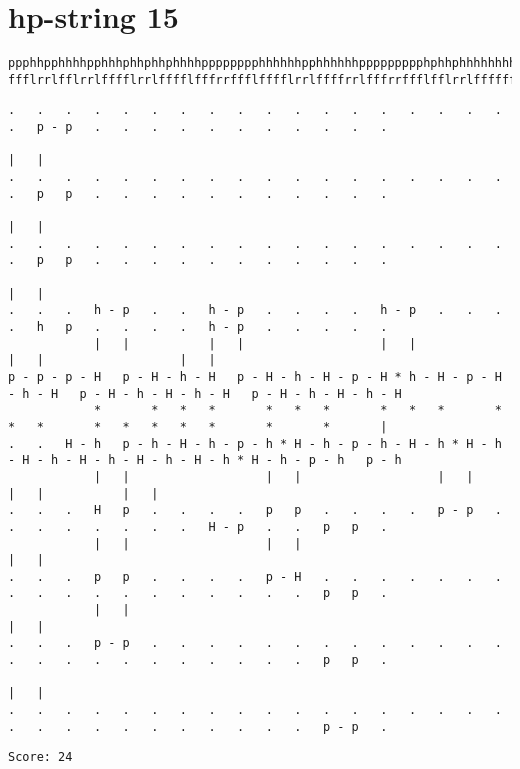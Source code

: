 \documentclass[a4paper,oneside,article,11pt]{memoir}
\begin{document}
\pagebreak

\section*{hp-string 15}
\begin{lstlisting}[basicstyle=\fontsize{6}{11}\ttfamily]
ppphhpphhhhpphhhphhphhphhhhpppppppphhhhhhpphhhhhhppppppppphphhphhhhhhhhhhhpphhhphhphpphphhhpppppphhh
ffflrrlfflrrlfffflrrlfffflfffrrffflfffflrrlffffrrlfffrrffflfflrrlfffffffflrrlfffflfrrflfffflffrrffl
\end{lstlisting}
\begin{lstlisting}[basicstyle=\fontsize{4}{11}\ttfamily]
.   .   .   .   .   .   .   .   .   .   .   .   .   .   .   .   .   .   .   p - p   .   .   .   .   .   .   .   .   .   .   .
                                                                            |   |
.   .   .   .   .   .   .   .   .   .   .   .   .   .   .   .   .   .   .   p   p   .   .   .   .   .   .   .   .   .   .   .
                                                                            |   |
.   .   .   .   .   .   .   .   .   .   .   .   .   .   .   .   .   .   .   p   p   .   .   .   .   .   .   .   .   .   .   .
                                                                            |   |
.   .   .   h - p   .   .   h - p   .   .   .   .   h - p   .   .   .   .   h   p   .   .   .   .   h - p   .   .   .   .   .
            |   |           |   |                   |   |                   |   |                   |   |
p - p - p - H   p - H - h - H   p - H - h - H - p - H * h - H - p - H - h - H   p - H - h - H - h - H   p - H - h - H - h - H
            *       *   *   *       *   *   *       *   *   *       *   *   *       *   *   *   *   *       *       *       |
.   .   H - h   p - h - H - h - p - h * H - h - p - h - H - h * H - h - H - h - H - h - H - h - H - h * H - h - p - h   p - h
            |   |                   |   |                   |   |                                   |   |           |   |
.   .   .   H   p   .   .   .   .   p   p   .   .   .   .   p - p   .   .   .   .   .   .   .   .   H - p   .   .   p   p   .
            |   |                   |   |                                                                           |   |
.   .   .   p   p   .   .   .   .   p - H   .   .   .   .   .   .   .   .   .   .   .   .   .   .   .   .   .   .   p   p   .
            |   |                                                                                                   |   |
.   .   .   p - p   .   .   .   .   .   .   .   .   .   .   .   .   .   .   .   .   .   .   .   .   .   .   .   .   p   p   .
                                                                                                                    |   |
.   .   .   .   .   .   .   .   .   .   .   .   .   .   .   .   .   .   .   .   .   .   .   .   .   .   .   .   .   p - p   .
\end{lstlisting}
\begin{lstlisting}
Score: 24
\end{lstlisting}
\clearpage
\end{document}

